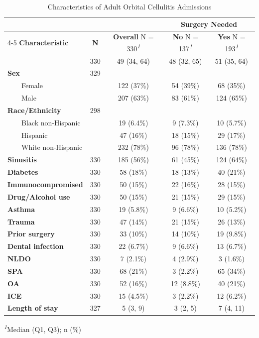 \documentclass[
]{article}
\begin{document}
\begin{table}[t]
\caption*{
{\fontsize{20}{25}\selectfont  Characteristics of Adult Orbital Cellulitis Admissions\small }
} 
\begin{tabular*}{0.7\linewidth}{@{\extracolsep{\fill}}lcccc}
\toprule
 &  &  & \multicolumn{2}{c}{\textbf{Surgery Needed}} \\ 
\cmidrule(lr){4-5}
\textbf{Characteristic} & \textbf{N} & \textbf{Overall}  N = 330\textsuperscript{\textit{1}} & \textbf{No}  N = 137\textsuperscript{\textit{1}} & \textbf{Yes}  N = 193\textsuperscript{\textit{1}} \\ 
\midrule\addlinespace[2.5pt]
{\bfseries Age} & 330 & 49 (34, 64) & 48 (32, 65) & 51 (35, 64) \\ 
{\bfseries Sex} & 329 &  &  &  \\ 
    Female &  & 122 (37\%) & 54 (39\%) & 68 (35\%) \\ 
    Male &  & 207 (63\%) & 83 (61\%) & 124 (65\%) \\ 
{\bfseries Race/Ethnicity} & 298 &  &  &  \\ 
    Black non-Hispanic &  & 19 (6.4\%) & 9 (7.3\%) & 10 (5.7\%) \\ 
    Hispanic &  & 47 (16\%) & 18 (15\%) & 29 (17\%) \\ 
    White non-Hispanic &  & 232 (78\%) & 96 (78\%) & 136 (78\%) \\ 
{\bfseries Sinusitis} & 330 & 185 (56\%) & 61 (45\%) & 124 (64\%) \\ 
{\bfseries Diabetes} & 330 & 58 (18\%) & 18 (13\%) & 40 (21\%) \\ 
{\bfseries Immunocompromised} & 330 & 50 (15\%) & 22 (16\%) & 28 (15\%) \\ 
{\bfseries Drug/Alcohol use} & 330 & 50 (15\%) & 21 (15\%) & 29 (15\%) \\ 
{\bfseries Asthma} & 330 & 19 (5.8\%) & 9 (6.6\%) & 10 (5.2\%) \\ 
{\bfseries Trauma} & 330 & 47 (14\%) & 21 (15\%) & 26 (13\%) \\ 
{\bfseries Prior surgery} & 330 & 33 (10\%) & 14 (10\%) & 19 (9.8\%) \\ 
{\bfseries Dental infection} & 330 & 22 (6.7\%) & 9 (6.6\%) & 13 (6.7\%) \\ 
{\bfseries NLDO} & 330 & 7 (2.1\%) & 4 (2.9\%) & 3 (1.6\%) \\ 
{\bfseries SPA} & 330 & 68 (21\%) & 3 (2.2\%) & 65 (34\%) \\ 
{\bfseries OA} & 330 & 52 (16\%) & 12 (8.8\%) & 40 (21\%) \\ 
{\bfseries ICE} & 330 & 15 (4.5\%) & 3 (2.2\%) & 12 (6.2\%) \\ 
{\bfseries Length of stay} & 327 & 5 (3, 9) & 3 (2, 5) & 7 (4, 11) \\ 
\bottomrule
\end{tabular*}
\begin{minipage}{\linewidth}
\textsuperscript{\textit{1}}Median (Q1, Q3); n (\%)\\
\end{minipage}
\end{table}
\end{document}
